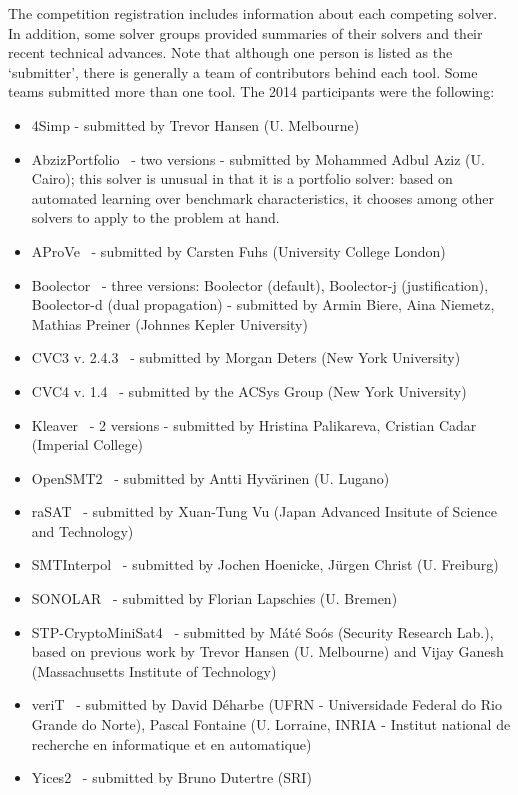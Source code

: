 \documentclass[twoside,11pt]{article}
\begin{document}
The competition registration includes information about each competing solver. In addition, some solver groups provided summaries of their solvers and their recent technical advances.
 Note that although one person is listed as the `submitter', there is generally a team of contributors behind each tool. Some teams submitted more than one tool. The 2014 participants were the following:
\begin{itemize}
\item 4Simp - submitted by Trevor Hansen (U. Melbourne)
\item AbzizPortfolio~\cite{TBD} - two versions - submitted by Mohammed Adbul Aziz (U. Cairo); this solver is unusual in that it is a portfolio solver: based on automated learning over benchmark characteristics, it chooses among other solvers to apply to the problem at hand.
\item AProVe~\cite{AProVE2014} - submitted by Carsten Fuhs (University College London)
\item Boolector~\cite{Boolector2015} - three versions: Boolector (default), Boolector-j (justification), Boolector-d (dual propagation) - submitted by Armin Biere, Aina Niemetz, Mathias Preiner (Johnnes Kepler University)
\item CVC3 v. 2.4.3~\cite{BT07} - submitted by Morgan Deters (New York University)
\item CVC4 v. 1.4~\cite{BCD+11} - submitted by the ACSys Group (New York University)
\item Kleaver~\cite{TBD} - 2 versions - submitted by Hristina Palikareva, Cristian Cadar (Imperial College)
\item OpenSMT2~\cite{TBD} - submitted by Antti Hyv\"arinen (U. Lugano)
\item raSAT~\cite{DBLP:conf/smt/KhanhVO14} - submitted by Xuan-Tung Vu (Japan Advanced Insitute of Science and Technology)
\item SMTInterpol~\cite{DBLP:conf/spin/ChristHN12,DBLP:conf/spin/2012} - submitted by Jochen Hoenicke, J\"urgen Christ (U. Freiburg)
\item SONOLAR~\cite{Peleska:2011:ATC:1986308.1986333} - submitted by Florian Lapschies (U. Bremen)
\item STP-CryptoMiniSat4~\cite{DBLP:conf/cav/GaneshD07,DBLP:conf/cav/2007} - submitted by M\'at\'e So\'os (Security Research Lab.), based on previous work by Trevor Hansen (U. Melbourne) and Vijay Ganesh (Massachusetts Institute of Technology)
\item veriT~\cite{veriT} - submitted by David D\'{e}harbe (UFRN - Universidade Federal do Rio Grande do Norte), Pascal Fontaine (U. Lorraine, INRIA - Institut national de recherche en informatique et en automatique)
\item Yices2~\cite{Dutertre:cav2014} - submitted by Bruno Dutertre (SRI)
\end{itemize}
\end{document}
